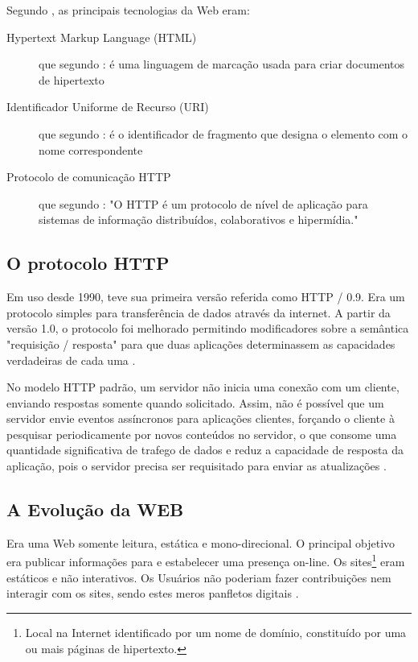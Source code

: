 Segundo \citet{Aghaei2012}, as principais tecnologias da Web eram:
\begin{description}
	\item[Hypertext Markup Language (HTML)] que segundo \citet{Berners-Lee1993}: é uma linguagem de marcação usada para criar documentos de hipertexto

	\item[Identificador Uniforme de Recurso (URI)]  que segundo \citet{Connolly2000}: é o identificador de fragmento que designa o elemento com o nome correspondente

	\item[Protocolo de comunicação HTTP] que segundo \citet[p.~7]{Fielding1999}: "O HTTP é um protocolo de nível de aplicação para sistemas de informação distribuídos, colaborativos e hipermídia."
\end{description}

\subsection{O protocolo HTTP}
Em uso desde 1990, teve sua primeira versão referida como HTTP / 0.9. Era um protocolo simples para transferência de dados através da internet. A partir da versão 1.0, o protocolo foi melhorado permitindo modificadores sobre a semântica "requisição / resposta" para que duas aplicações determinassem as capacidades verdadeiras de cada uma \citep[p.~7]{Fielding1999}.

No modelo HTTP padrão, um servidor não inicia uma conexão com um cliente, enviando respostas somente quando solicitado. Assim, não é possível que um servidor envie eventos assíncronos para aplicações clientes, forçando o cliente à pesquisar periodicamente por novos conteúdos no servidor, o que consome uma quantidade significativa de trafego de dados e reduz a capacidade de resposta da aplicação, pois o servidor precisa ser requisitado para enviar as atualizações \citep{Loreto2011}.

\subsection{A Evolução da WEB}
Era uma Web somente leitura, estática e mono-direcional. O principal objetivo era publicar informações para e estabelecer uma presença on-line. Os sites\footnote{Local na Internet identificado por um nome de domínio, constituído por uma ou mais páginas de hipertexto.} eram estáticos e não interativos. Os Usuários não poderiam fazer contribuições nem interagir com os sites, sendo estes meros panfletos digitais \citep[p.~2-3]{Aghaei2012}.

